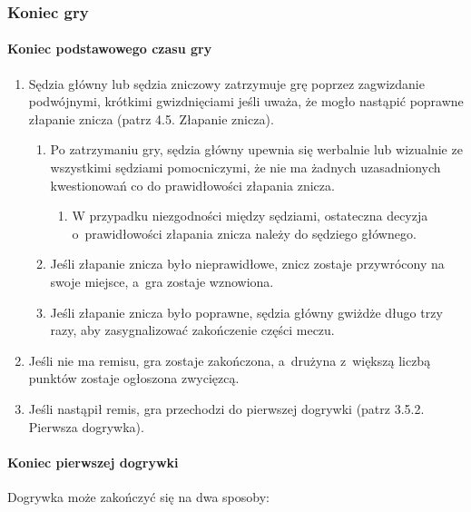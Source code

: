 \documentclass[12pt,a4paper]{article}
\begin{document}
\subsubsection{Koniec gry}

\paragraph{Koniec podstawowego czasu gry}
\begin{enumerate}
	\item Sędzia główny lub sędzia zniczowy zatrzymuje grę poprzez
	      zagwizdanie podwójnymi, krótkimi gwizdnięciami jeśli uważa, że mogło
	      nastąpić poprawne złapanie znicza (patrz 4.5. Złapanie znicza).
	      \begin{enumerate}
		      \item Po zatrzymaniu gry, sędzia główny upewnia się werbalnie lub
		            wizualnie ze wszystkimi sędziami pomocniczymi, że nie ma żadnych
		            uzasadnionych kwestionowań co do prawidłowości złapania znicza.

		            \begin{enumerate}
			            \item
			                  W przypadku niezgodności między sędziami, ostateczna decyzja o~prawidłowości złapania znicza należy do sędziego głównego.
		            \end{enumerate}

		      \item Jeśli złapanie znicza było nieprawidłowe, znicz zostaje przywrócony
		            na swoje miejsce, a~gra zostaje wznowiona.

		      \item Jeśli złapanie znicza było poprawne,
		            sędzia główny gwiżdże długo trzy razy, aby zasygnalizować zakończenie
		            części meczu.
	      \end{enumerate}

	\item Jeśli nie ma remisu, gra zostaje zakończona, a~drużyna z~większą
	      liczbą punktów zostaje ogłoszona zwycięzcą.

	\item Jeśli nastąpił remis, gra przechodzi do pierwszej dogrywki (patrz
	      3.5.2. Pierwsza dogrywka).
\end{enumerate}

\paragraph{Koniec pierwszej dogrywki}
Dogrywka może zakończyć
się na dwa sposoby:
\end{document}

